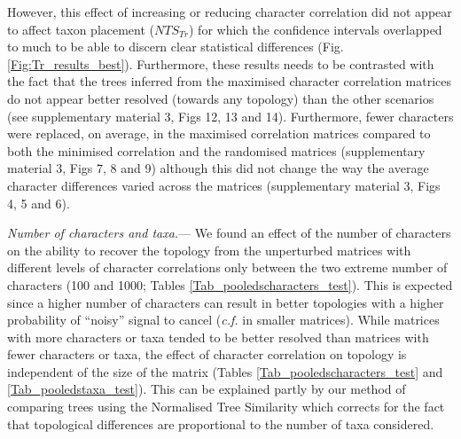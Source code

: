 \documentclass[12pt,letterpaper]{article}
\renewcommand{\subsubsection}[1]{%
\vspace{2ex}
\noindent
\textit{#1.}---}
\begin{document}
However, this effect of increasing or reducing character correlation did not appear to affect taxon placement ($NTS_{Tr}$) for which the confidence intervals overlapped to much to be able to discern clear statistical differences (Fig.\ref{Fig:Tr_results_best}).
Furthermore, these results needs to be contrasted with the fact that the trees inferred from the maximised character correlation matrices do not appear better resolved (towards any topology) than the other scenarios (see supplementary material 3, Figs 12, 13 and 14).
Furthermore, fewer characters were replaced, on average, in the maximised correlation matrices compared to both the minimised correlation and the randomised matrices (supplementary material 3, Figs 7, 8 and 9) although this did not change the way the average character differences varied across the matrices (supplementary material 3, Figs 4, 5 and 6).

\subsubsection{Number of characters and taxa}
We found an effect of the number of characters on the ability to recover the topology from the unperturbed matrices with different levels of character correlations only between the two extreme number of characters (100 and 1000; Tables \ref{Tab_pooledscharacters_test}).
This is expected since a higher number of characters can result in better topologies with a higher probability of ``noisy'' signal to cancel (\textit{c.f.} in smaller matrices).
While matrices with more characters or taxa tended to be better resolved than matrices with fewer characters or taxa, the effect of character correlation on topology is independent of the size of the matrix (Tables \ref{Tab_pooledscharacters_test} and \ref{Tab_pooledstaxa_test}).
This can be explained partly by our method of comparing trees using the Normalised Tree Similarity \citep[$NTS$;][]{Bogdanowicz2012} which corrects for the fact that topological differences are proportional to the number of taxa considered.
\end{document}
